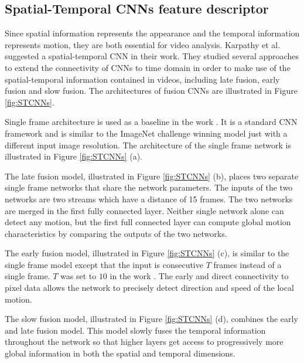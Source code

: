 \subsection{Spatial-Temporal CNNs feature descriptor}
\label{2_3_1}

Since spatial information represents the appearance and the temporal information represents motion, they are both essential for video analysis. Karpathy et al. suggested a spatial-temporal CNN in their work\cite{karpathy2014}. They studied several approaches to extend the connectivity of CNNs to time domain in order to make use of the spatial-temporal information contained in videos, including late fusion, early fusion and slow fusion. The architectures of fusion CNNs are illustrated in Figure \ref{fig:STCNNs}. 
\par 
Single frame architecture is used as a baseline in the work \cite{karpathy2014}. It is a standard CNN framework and is similar to the ImageNet challenge winning model \cite{kriz2012} just with a different input image resolution. The architecture of the single frame network is illustrated in Figure \ref{fig:STCNNs} (a).
\par 
The late fusion model, illustrated in Figure \ref{fig:STCNNs} (b), places two separate single frame networks that share the network parameters. The inputs of the two networks are two streams which have a distance of 15 frames. The two networks are merged in the first fully connected layer. Neither single network alone can detect any motion, but the first full connected layer can compute global motion characteristics by comparing the outputs of the two networks. 
\par 
The early fusion model, illustrated in Figure \ref{fig:STCNNs} (c), is similar to the single frame model except that the input is consecutive \(T\) frames instead of a single frame. \(T\) was set to \(10\) in the work \cite{karpathy2014}. The early and direct connectivity to pixel data allows the network to precisely detect direction and speed of the local motion.
\par 
The slow fusion model, illustrated in Figure \ref{fig:STCNNs} (d),  combines the early and late fusion model. This model slowly fuses the temporal information throughout the network so that higher layers get access to progressively more global information in both the spatial and temporal dimensions. 

